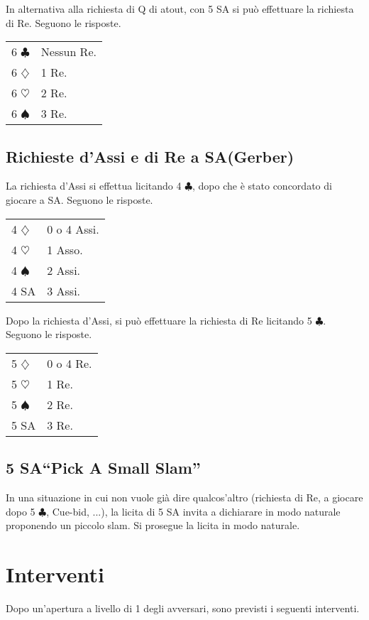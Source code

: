 \documentclass[a4paper,10pt]{article}
\renewcommand{\c}{$\clubsuit$\xspace}
\renewcommand{\d}{$\diamondsuit$\xspace}
\newcommand{\h}{$\heartsuit$\xspace}
\newcommand{\s}{$\spadesuit$\xspace}
\newcommand{\sa}{SA\xspace}
\newcommand{\smallspace}{\vskip0.3cm}
\newenvironment{twocol}
  {\smallspace\noindent\begin{tabular}{l p{0.78\textwidth}}}
  {\end{tabular}\smallspace}
\begin{document}
\smallspace

\noindent In alternativa alla richiesta di Q di atout, con 5 \sa si può effettuare la richiesta di Re. Seguono le risposte.

\begin{twocol}
6 \c & Nessun Re.\\
6 \d & 1 Re.\\
6 \h & 2 Re.\\
6 \s & 3 Re. \\
\end{twocol}


\subsection{Richieste d'Assi e di Re a \sa (Gerber)}

La richiesta d'Assi si effettua licitando 4 \c, dopo che è stato concordato di giocare a \sa. Seguono le risposte.
\begin{twocol}
  4 \d & 0 o 4 Assi.\\
  4 \h & 1 Asso.\\
  4 \s & 2 Assi.\\
  4 \sa & 3 Assi.
\end{twocol}

\noindent Dopo la richiesta d'Assi, si può effettuare la richiesta di Re licitando 5 \c. Seguono le risposte.
\begin{twocol}
  5 \d & 0 o 4 Re.\\
  5 \h & 1 Re.\\
  5 \s & 2 Re.\\
  5 \sa & 3 Re.
\end{twocol}


\subsection{5 \sa ``Pick A Small Slam''}

In una situazione in cui non vuole già dire qualcos'altro (richiesta di Re, a giocare dopo 5 \c, Cue-bid, ...), la licita di 5 \sa invita a dichiarare in modo naturale proponendo un piccolo slam. Si prosegue la licita in modo naturale.



\pagebreak
\section{Interventi}

Dopo un'apertura a livello di 1 degli avversari, sono previsti i seguenti interventi.
\end{document}
